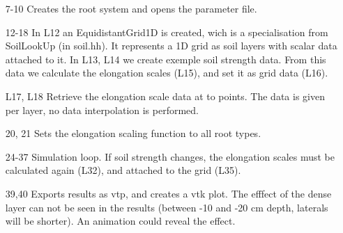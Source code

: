 \begin{itemize}

\item[7-10] Creates the root system and opens the parameter file.

\item[12-18] In L12 an EquidistantGrid1D is created, wich is a specialisation from SoilLookUp (in soil.hh). It represents a 1D grid as soil layers with scalar data attached to it. In L13, L14 we create exemple soil strength data. From this data we calculate the elongation scales (L15), and set it as grid data (L16). 

\item[L17, L18] Retrieve the elongation scale data at to points. The data is given per layer, no data interpolation is performed.

\item[20, 21] Sets the elongation scaling function to all root types.

\item[24-37] Simulation loop. If soil strength changes, the elongation scales must be calculated again (L32), and attached to the grid (L35).

\item[39,40] Exports results as vtp, and creates a vtk plot. The efffect of the dense layer can not be seen in the results (between -10 and -20 cm depth, laterals will be shorter). An animation could reveal the effect. 

\end{itemize}

